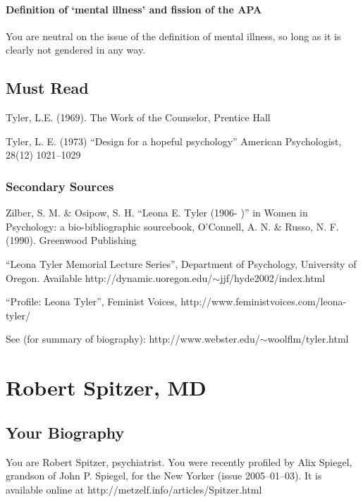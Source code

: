 \begin{refsection}
\subsubsection{Definition of ‘mental illness’ and fission of the APA}
\label{definitionof‘mentalillness’andfissionoftheapa}

You are neutral on the issue of the definition of mental illness, so long as it is clearly not gendered in any way.

\section{Must Read}
\label{mustread}

Tyler, L.E. (1969). The Work of the Counselor, Prentice Hall

Tyler, L. E. (1973) “Design for a hopeful psychology” American Psychologist, 28(12) 1021--1029

\subsection{Secondary Sources}
\label{secondarysources}

Zilber, S. M. \& Osipow, S. H. “Leona E. Tyler (1906- )” in Women in Psychology: a bio-bibliographic sourcebook, O'Connell, A. N. \& Russo, N. F. (1990). Greenwood Publishing

“Leona Tyler Memorial Lecture Series”, Department of Psychology, University of Oregon. Available http:\slash \slash dynamic.uoregon.edu\slash \ensuremath{\sim}jjf\slash hyde2002\slash index.html

“Profile: Leona Tyler”, Feminist Voices, http:\slash \slash www.feministvoices.com\slash leona-tyler\slash 

See (for summary of biography): http:\slash \slash www.webster.edu\slash \ensuremath{\sim}woolflm\slash tyler.html

\chapter{Robert Spitzer, MD}
\label{robertspitzermd}

\section{Your Biography}
\label{yourbiography}

You are Robert Spitzer, psychiatrist. You were recently profiled by Alix Spiegel, grandson of John P. Spiegel, for the New Yorker (issue 2005--01--03). It is available online at http:\slash \slash metzelf.info\slash articles\slash Spitzer.html


\end{refsection}
